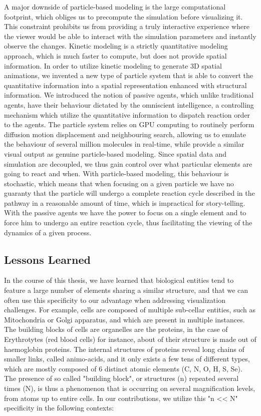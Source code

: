 A major downside of particle-based modeling is the large computational footprint, which obliges us to precompute the simulation before visualizing it.
This constraint prohibits us from providing a truly interactive experience where the viewer would be able to interact with the simulation parameters and instantly observe the changes.
Kinetic modeling is a strictly quantitative modeling approach, which is much faster to compute, but does not provide spatial information.
In order to utilize kinetic modeling to generate 3D spatial animations, we invented a new type of particle system that is able to convert the quantitative information into a spatial representation enhanced with structural information. 
We introduced the notion of passive agents, which unlike traditional agents, have their behaviour dictated by the omniscient intelligence, a controlling mechanism which utilize the quantitative information to dispatch reaction order to the agents.
The particle system relies on GPU computing to routinely perform diffusion motion displacement and neighbouring search, allowing us to emulate the behaviour of several million molecules in real-time, while provide a similar visual output as genuine particle-based modeling.
Since spatial data and simulation are decoupled, we thus gain control over what particular elements are going to react and when.
With particle-based modeling, this behaviour is stochastic, which means that when focusing on a given particle we have no guaranty that the particle will undergo a complete reaction cycle described in the pathway in a reasonable amount of time, which is impractical for story-telling.
With the passive agents we have the power to focus on a single element and to force him to undergo an entire reaction cycle, thus facilitating the viewing of the dynamics of a given process.

\subsection{Lessons Learned}

In the course of this thesis, we have learned that biological entities tend to feature a large number of elements sharing a similar structure, and that we can often use this specificity to our advantage when addressing visualization challenges.
For example, cells are composed of multiple sub-cellar entities, such as Mitochondria or Golgi apparatus, and which are present in multiple instances.
The building blocks of cells are organelles are the proteins, in the case of Erythrotytes (red blood cells) for instance, about  of their structure is made out of haemoglobin proteins. 
The internal structures of proteins reveal long chains of smaller links, called animo-acids, and it only exists a few tens of different types, which are mostly composed of 6 distinct atomic elements (C, N, O, H, S, Se).
The presence of so called "building block", or structures (n) repeated several times (N), is thus a phenomenon that is occurring on several magnification levels, from atoms up to entire cells.
In our contributions, we utilize this "n << N" specificity in the following contexts:

